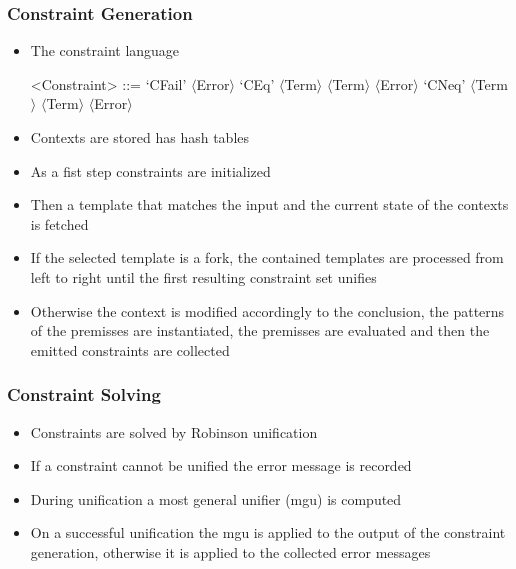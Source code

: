 \documentclass{beamer}
\begin{document}
\begin{frame}
  \frametitle{Constraint Generation}
  \begin{itemize}
  \item The constraint language
  \begin{grammar}
    <Constraint> ::= `CFail' $\langle$Error$\rangle$
    \alt `CEq' $\langle$Term$\rangle$ $\langle$Term$\rangle$ $\langle$Error$\rangle$
    \alt `CNeq' $\langle$Term$\rangle$ $\langle$Term$\rangle$ $\langle$Error$\rangle$
  \end{grammar}
  \item Contexts are stored has hash tables
  \item As a fist step constraints are initialized
  \item Then a template that matches the input and the current state
    of the contexts is fetched
  \item If the selected template is a fork, the contained templates
    are processed from left to right until the first resulting
    constraint set unifies
  \item Otherwise the context is modified accordingly to the
    conclusion, the patterns of the premisses are instantiated, the
    premisses are evaluated and then the emitted constraints are
    collected
  \end{itemize}
\end{frame}

\renewcommand*\selectConstraintSolving{orange}
\renewcommand*\selectConstraintSolving{}

\begin{frame}
  \frametitle{Constraint Solving}
  \begin{itemize}
  \item Constraints are solved by Robinson unification
  \item If a constraint cannot be unified the error message is recorded
  \item During unification a most general unifier (mgu) is computed
  \item On a successful unification the mgu is applied to the output
    of the constraint generation, otherwise it is applied to the
    collected error messages
  \end{itemize}
\end{frame}
\end{document}
